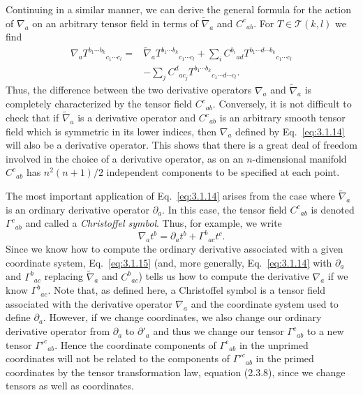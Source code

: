 Continuing in a similar manner, we can derive the general formula for the action
of $\nabla_a$ on an arbitrary tensor field in terms of $\widetilde\nabla_a$ and $C^c{}_{ab}$. For $T\in\mathcal T(k,l)$ we find
\begin{equation}
  \begin{aligned}
    \nabla_aT^{b_1\cdots b_k}{}_{c_1\cdots c_l}
    ={}&\widetilde\nabla_aT^{b_1\cdots b_k}{}_{c_1\cdots c_l}
    +\sum_i C^{b_i}{}_{ad}T^{b_1\cdots d\cdots b_k}{}_{c_1\cdots c_l}\\
    &-\sum_j C^d{}_{ac_j}T^{b_1\cdots b_k}{}_{c_1\cdots d\cdots c_l}.
  \end{aligned}
  \tag{3.1.14}\label{eq:3.1.14}
\end{equation}
Thus, the difference between the two derivative operators $\nabla_a$ and $\widetilde\nabla_a$ is completely
characterized by the tensor field $C^c{}_{ab}$. Conversely, it is not difficult to check that if
$\widetilde\nabla_a$ is a derivative operator and $C^c{}_{ab}$ is an arbitrary smooth tensor field which is
symmetric in its lower indices, then $\nabla_a$ defined by Eq.~\eqref{eq:3.1.14} will also be a
derivative operator. This shows that there is a great deal of freedom involved in the
choice of a derivative operator, as on an $n$-dimensional manifold $C^c{}_{ab}$ has $n^2(n+1)/2$
independent components to be specified at each point.

The most important application of Eq.~\eqref{eq:3.1.14} arises from the case where $\widetilde\nabla_a$
is an ordinary derivative operator $\partial_a$. In this case, the tensor field $C^c{}_{ab}$ is denoted $\Gamma^c{}_{ab}$
and called a \emph{Christoffel symbol}. Thus, for example, we write
\begin{equation}
  \nabla_at^b=\partial_at^b+\Gamma^b{}_{ac}t^c.
  \tag{3.1.15}\label{eq:3.1.15}
\end{equation}
Since we know how to compute the ordinary derivative associated with a given
coordinate system, Eq.~\eqref{eq:3.1.15} (and, more generally, Eq.~\eqref{eq:3.1.14} with $\partial_a$ and
$\Gamma^b{}_{ac}$ replacing $\widetilde\nabla_a$ and $C^b{}_{ac}$) tells us how to compute the derivative $\nabla_a$ if we know
$\Gamma^b{}_{ac}$. Note that, as defined here, a Christoffel symbol is a tensor field associated with the
derivative operator $\nabla_a$ and the coordinate system used to define $\partial_a$. However, if we
change coordinates, we also change our ordinary derivative operator from $\partial_a$ to $\partial'_a$
and thus we change our tensor $\Gamma^c{}_{ab}$ to a new tensor $\Gamma'^c{}_{ab}$. Hence the coordinate
components of $\Gamma^c{}_{ab}$ in the unprimed coordinates will not be related to the components
of $\Gamma'^c{}_{ab}$ in the primed coordinates by the tensor transformation law, equation (2.3.8),
since we change tensors as well as coordinates.


